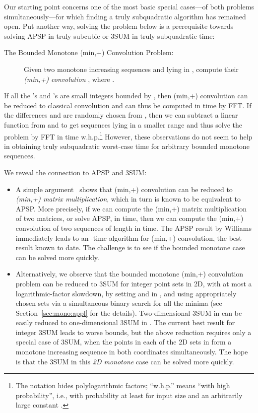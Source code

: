\documentclass[11pt]{article}
\begin{document}
Our starting point concerns one of the most basic special cases---of both problems simultaneously---for which finding a truly subquadratic algorithm has remained open.  Put another way, solving the problem below is
a prerequisite towards solving APSP in truly subcubic
or 3SUM in truly subquadratic time:

\begin{description}
\item[The Bounded Monotone (min,+) Convolution Problem:]
Given two monotone increasing sequences  and  lying in , compute their \emph{(min,+)
convolution} , where
.
\end{description}

If all the 's and 's are small integers bounded by , then (min,+) convolution can be reduced to classical convolution and can
thus be computed in  time by FFT\@.
If the differences  and  are randomly
chosen from , then we can subtract a linear function 
from  and  to get sequences lying in a smaller
range 
and thus solve the problem by FFT in  time w.h.p.\footnote{
The  notation hides polylogarithmic factors;
``w.h.p.'' means ``with high probability'', i.e., with probability
at least  for input size  and an arbitrarily large
constant .
}
However, these observations do not seem to help in obtaining truly subquadratic worst-case time
for arbitrary bounded monotone sequences.

We reveal the connection to APSP and 3SUM:
\begin{itemize}
\item
A simple argument~\cite{BCDEHILPT14} shows that
(min,+) convolution can be reduced to
\emph{(min,+) matrix multiplication}, which in turn is known to
be equivalent to APSP\@.  More precisely, if we can
compute the (min,+) matrix multiplication of two  matrices, or solve APSP, in  time, then we can compute the (min,+) convolution of two sequences of length  in  time.  The APSP result by Williams immediately leads to an -time algorithm for (min,+) convolution, the best result known
to date.  The challenge is to see if the bounded monotone case
can be solved more quickly.
\item
Alternatively, we observe that the bounded monotone (min,+) convolution problem can be reduced to 3SUM
for integer point sets in 2D, with at most a logarithmic-factor
slowdown, by setting
 and
 in , and
using  appropriately chosen sets  via
a simultaneous binary search for all the minima (see Section~\ref{sec:mono:appl} for the
details).
Two-dimensional 3SUM in  can be easily
reduced to one-dimensional 3SUM in .
The current best result for integer 3SUM
leads to worse bounds, but the above reduction requires only
a special case of 3SUM, when the points in each of the 2D sets
 in  form a monotone increasing sequence in both
coordinates simultaneously.  The hope is that the 3SUM
in this \emph{2D monotone} case can be solved more quickly.
\end{itemize}
\end{document}
